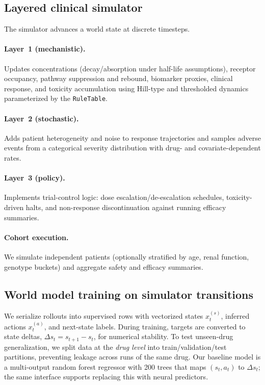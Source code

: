 \subsection{Layered clinical simulator}
\label{sec:sim}

The simulator advances a world state at discrete timesteps.

\paragraph{Layer~1 (mechanistic).}
Updates concentrations (decay/absorption under half-life assumptions), receptor occupancy, pathway suppression and rebound, biomarker proxies, clinical response, and toxicity accumulation using Hill-type and thresholded dynamics parameterized by the \texttt{RuleTable}.

\paragraph{Layer~2 (stochastic).}
Adds patient heterogeneity and noise to response trajectories and samples adverse events from a categorical severity distribution with drug- and covariate-dependent rates.

\paragraph{Layer~3 (policy).}
Implements trial-control logic: dose escalation/de-escalation schedules, toxicity-driven halts, and non-response discontinuation against running efficacy summaries.

\paragraph{Cohort execution.}
We simulate independent patients (optionally stratified by age, renal function, genotype buckets) and aggregate safety and efficacy summaries.

\subsection{World model training on simulator transitions}
\label{sec:wm}

We serialize rollouts into supervised rows with vectorized states $x^{(s)}_t$, inferred actions $x^{(a)}_t$, and next-state labels. During training, targets are converted to state deltas, $\Delta s_t = s_{t+1}-s_t$, for numerical stability. To test unseen-drug generalization, we split data at the \emph{drug level} into train/validation/test partitions, preventing leakage across runs of the same drug. Our baseline model is a multi-output random forest regressor with 200 trees that maps $(s_t,a_t)$ to $\Delta s_t$; the same interface supports replacing this with neural predictors.

